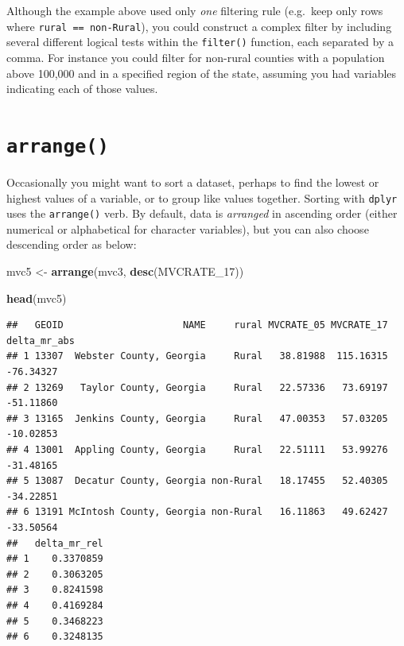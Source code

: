 \documentclass[
]{book}
\newenvironment{Shaded}{\begin{snugshade}}{\end{snugshade}}
\newcommand{\FunctionTok}[1]{\textcolor[rgb]{0.13,0.29,0.53}{\textbf{#1}}}
\newcommand{\NormalTok}[1]{#1}
\newcommand{\OtherTok}[1]{\textcolor[rgb]{0.56,0.35,0.01}{#1}}
\newenvironment{rmdnote}[1]
  {
  \begin{itemize}
  \renewcommand{\labelitemi}{
    \raisebox{-.7\height}[0pt][0pt]{
      {\setkeys{Gin}{width=3em,keepaspectratio}\texttt{[image: images/\#1]}}
    }
  }
  \setlength{\fboxsep}{1em}
  \begin{note}
  \item
  }
  {
  \end{note}
  \end{itemize}
  }
\begin{document}
\begin{rmdnote}{note}
Although the example above used only \emph{one} filtering rule (e.g.~keep only rows where \texttt{rural\ ==\ \textquotesingle{}non-Rural\textquotesingle{}}), you could construct a complex filter by including several different logical tests within the \texttt{filter()} function, each separated by a comma. For instance you could filter for non-rural counties with a population above 100,000 and in a specified region of the state, assuming you had variables indicating each of those values.

\end{rmdnote}

\hypertarget{arrange}{%
\section{\texorpdfstring{\texttt{arrange()}}{arrange()}}\label{arrange}}

Occasionally you might want to sort a dataset, perhaps to find the lowest or highest values of a variable, or to group like values together. Sorting with \texttt{dplyr} uses the \texttt{arrange()} verb. By default, data is \emph{arranged} in ascending order (either numerical or alphabetical for character variables), but you can also choose descending order as below:

\begin{Shaded}
\begin{Highlighting}[]
\NormalTok{mvc5 }\OtherTok{\textless{}{-}} \FunctionTok{arrange}\NormalTok{(mvc3, }\FunctionTok{desc}\NormalTok{(MVCRATE\_17))}

\FunctionTok{head}\NormalTok{(mvc5)}
\end{Highlighting}
\end{Shaded}

\begin{verbatim}
##   GEOID                     NAME     rural MVCRATE_05 MVCRATE_17 delta_mr_abs
## 1 13307  Webster County, Georgia     Rural   38.81988  115.16315    -76.34327
## 2 13269   Taylor County, Georgia     Rural   22.57336   73.69197    -51.11860
## 3 13165  Jenkins County, Georgia     Rural   47.00353   57.03205    -10.02853
## 4 13001  Appling County, Georgia     Rural   22.51111   53.99276    -31.48165
## 5 13087  Decatur County, Georgia non-Rural   18.17455   52.40305    -34.22851
## 6 13191 McIntosh County, Georgia non-Rural   16.11863   49.62427    -33.50564
##   delta_mr_rel
## 1    0.3370859
## 2    0.3063205
## 3    0.8241598
## 4    0.4169284
## 5    0.3468223
## 6    0.3248135
\end{verbatim}
\end{document}
